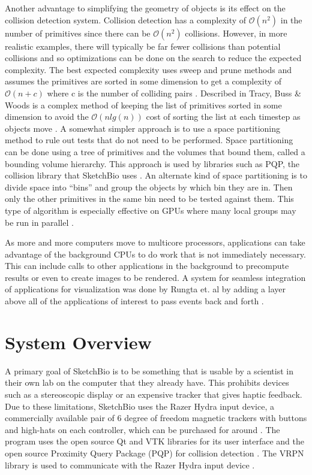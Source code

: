 \documentclass{article} %
\begin{document}
Another advantage to simplifying the geometry of objects is its effect on the collision detection system.  Collision detection has a complexity of $\mathcal{O}(n^2)$ in the number of primitives since there can be $\mathcal{O}(n^2)$ collisions.  However, in more realistic examples, there will typically be far fewer collisions than potential collisions and so optimizations can be done on the search to reduce the expected complexity.  The best expected complexity uses sweep and prune methods and assumes the primitives are sorted in some dimension to get a complexity of $\mathcal{O}(n + c)$ where c is the number of colliding pairs \cite{tracy2009efficient}.  Described in Tracy, Buss \& Woods is a complex method of keeping the list of primitives sorted in some dimension to avoid the $\mathcal{O}(n lg(n))$ cost of sorting the list at each timestep as objects move \cite{tracy2009efficient}.  A somewhat simpler approach is to use a space partitioning method to rule out tests that do not need to be performed.  Space partitioning can be done using a tree of primitives and the volumes that bound them, called a bounding volume hierarchy.  This approach is used by libraries such as PQP, the collision library that SketchBio uses \cite{PQP}.  An alternate kind of space partitioning is to divide space into “bins” and group the objects by which bin they are in.  Then only the other primitives in the same bin need to be tested against them.  This type of algorithm is especially effective on GPUs where many local groups may be run in parallel \cite{oat2008efficient}.

As more and more computers move to multicore processors, applications can take advantage of the background CPUs to do work that is not immediately necessary.  This can include calls to other applications in the background to precompute results or even to create images to be rendered.  A system for seamless integration of applications for visualization was done by Rungta et. al by adding a layer above all of the applications of interest to pass events back and forth \cite{rungta2013manyvis}.

\section{System Overview}
A primary goal of SketchBio is to be something that is usable by a scientist in their own lab on the computer that they already have.  This prohibits devices such as a stereoscopic display or an expensive tracker that gives haptic feedback.  Due to these limitations, SketchBio uses the Razer Hydra input device, a commercially available pair of 6 degree of freedom magnetic trackers with buttons and high-hats on each controller, which can be purchased for around .  The program uses the open source Qt and VTK\cite{VTKbook} libraries for its user interface and the open source Proximity Query Package (PQP) for collision detection \cite{PQP}.  The VRPN library is used to communicate with the Razer Hydra input device \cite{taylor2001vrpn}.
\end{document}
